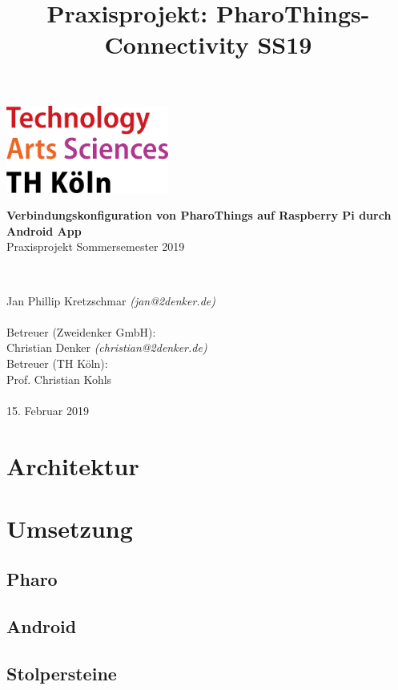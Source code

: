 \documentclass[12pt,a4paper]{article}
\title{Praxisprojekt: PharoThings-Connectivity SS19}
\begin{document}
	\begin{titlepage}
    \includegraphics[width=0.4\textwidth]{th_logo.png}
    ~\\[2.5cm]
    \begin{center}
    \textbf{\huge Verbindungskonfiguration von PharoThings auf Raspberry Pi durch Android App}\\[0.5cm]
    {\Large Praxisprojekt Sommersemester 2019}
    \vfill
    \end{center}
    ~\\[2.0cm]
    \begin{flushright}
    {\large Jan Phillip Kretzschmar \it{(jan@2denker.de)}}\\[0.1cm]
    ~\\[1.0cm]
    {\large Betreuer (Zweidenker GmbH):}\\[0.1cm]
    {\large Christian Denker \it{(christian@2denker.de)}}
    ~\\[0.5cm]
    {\large Betreuer (TH Köln):}\\[0.1cm]
    {\large Prof. Christian Kohls}\\[0.1cm]

	~\\[1.0cm]
    {\large 15. Februar 2019}
	\end{flushright}
    \end{titlepage}
    \tableofcontents
    \pagebreak
    
    \pagebreak
    
    \pagebreak
    \section{Architektur}

\section{Umsetzung}
\subsection{Pharo}
\subsection{Android}
\subsection{Stolpersteine}
\end{document}

